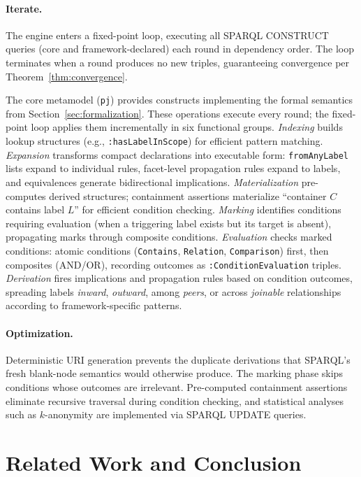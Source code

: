 \documentclass[runningheads,oneside]{llncs}
\begin{document}
\paragraph{Iterate.}
The engine enters a fixed-point loop, executing all SPARQL CONSTRUCT queries (core and framework-declared) each round in dependency order. The loop terminates when a round produces no new triples, guaranteeing convergence per Theorem~\ref{thm:convergence}.

The core metamodel ({\footnotesize\texttt{pj}}) provides constructs implementing the formal semantics from Section~\ref{sec:formalization}. These operations execute every round; the fixed-point loop applies them incrementally in six functional groups. \emph{Indexing} builds lookup structures (e.g., {\footnotesize\texttt{:hasLabelInScope}}) for efficient pattern matching. \emph{Expansion} transforms compact declarations into executable form: {\footnotesize\texttt{fromAnyLabel}} lists expand to individual rules, facet-level propagation rules expand to labels, and equivalences generate bidirectional implications. \emph{Materialization} pre-computes derived structures; containment assertions materialize ``container $C$ contains label $L$'' for efficient condition checking. \emph{Marking} identifies conditions requiring evaluation (when a triggering label exists but its target is absent), propagating marks through composite conditions. \emph{Evaluation} checks marked conditions: atomic conditions ({\footnotesize\texttt{Contains}}, {\footnotesize\texttt{Relation}}, {\footnotesize\texttt{Comparison}}) first, then composites (AND/OR), recording outcomes as {\footnotesize\texttt{:ConditionEvaluation}} triples. \emph{Derivation} fires implications and propagation rules based on condition outcomes, spreading labels \emph{inward}, \emph{outward}, among \emph{peers}, or across \emph{joinable} relationships according to framework-specific patterns.

\paragraph{Optimization.}
Deterministic URI generation prevents the duplicate derivations that SPARQL's fresh blank-node semantics would otherwise produce. The marking phase skips conditions whose outcomes are irrelevant. Pre-computed containment assertions eliminate recursive traversal during condition checking, and statistical analyses such as $k$-anonymity are implemented via SPARQL UPDATE queries.

\section{Related Work and Conclusion}\label{sec:related-conclusion}
\end{document}
